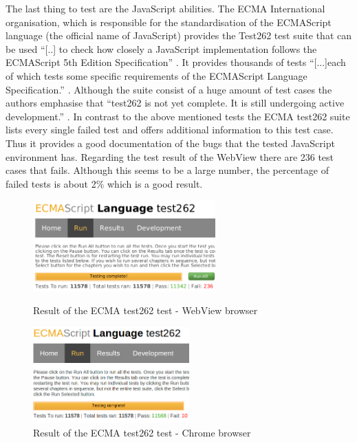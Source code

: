 The last thing to test are the JavaScript abilities.
The ECMA International organisation, which is responsible for the standardisation of the ECMAScript language (the official name of JavaScript) provides the Test262 test suite that can be used \enquote{[..] to check how closely a JavaScript implementation follows the ECMAScript 5th Edition Specification} \autocite{tech-ana:ECMAScript}.
It provides thousands of tests \enquote{[...]each of which tests some specific requirements of the ECMAScript Language Specification.} \autocite{tech-ana:ECMAtest}.
Although the suite consist of a huge amount of test cases the authors emphasise that \enquote{test262 is not yet complete. It is still undergoing active development.} \autocite{tech-ana:ECMAtest}.
In contrast to the above mentioned tests the ECMA test262 suite lists every single failed test and offers additional information to this test case.
Thus it provides a good documentation of the bugs that the tested JavaScript environment has.
Regarding the test result of the WebView there are 236 test cases that fails.
Although this seems to be a large number, the percentage of failed tests is about 2\% which is a good result.
   
\begin{figure}
\begin{minipage}[t]{7cm}
	\centering
	\includegraphics[width=7cm]{./img/tech-ana/ecma_result_webview_small.png}
	\caption{Result of the ECMA test262 test - WebView browser}
	\label{fig:ecma_webview}
\end{minipage}
\hfill
\begin{minipage}[t]{6cm}
	\centering
	\includegraphics[width=6cm]{./img/tech-ana/ecma_result_chrome_small.png}
	\caption{Result of the ECMA test262 test - Chrome browser}
	\label{fig:ecma_chrome}
\end{minipage}
\end{figure}

